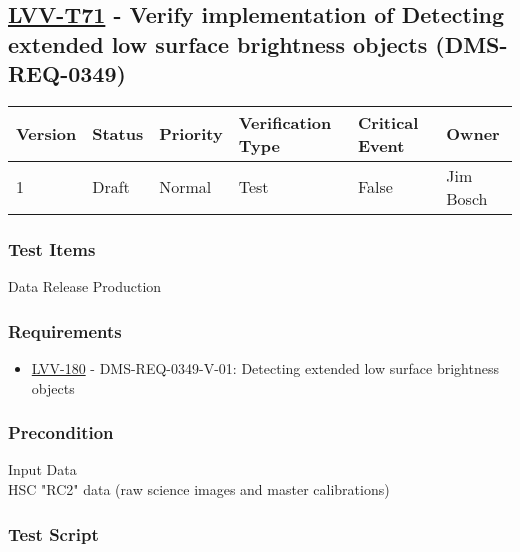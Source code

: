 \hypertarget{lvv-t71---verify-implementation-of-detecting-extended-low-surface-brightness-objects-dms-req-0349}{%
\subsection{\texorpdfstring{\href{https://jira.lsstcorp.org/secure/Tests.jspa\#/testCase/LVV-T71}{LVV-T71}
- Verify implementation of Detecting extended low surface brightness
objects
(DMS-REQ-0349)}{LVV-T71 - Verify implementation of Detecting extended low surface brightness objects (DMS-REQ-0349)}}\label{lvv-t71---verify-implementation-of-detecting-extended-low-surface-brightness-objects-dms-req-0349}}

\begin{longtable}[]{@{}llllll@{}}
\toprule
Version & Status & Priority & Verification Type & Critical Event &
Owner\tabularnewline
\midrule
\endhead
1 & Draft & Normal & Test & False & Jim Bosch\tabularnewline
\bottomrule
\end{longtable}

\hypertarget{test-items-47}{%
\subsubsection{Test Items}\label{test-items-47}}

Data Release Production

\hypertarget{requirements-48}{%
\subsubsection{Requirements}\label{requirements-48}}

\begin{itemize}
\tightlist
\item
  \href{https://jira.lsstcorp.org/browse/LVV-180}{LVV-180} -
  DMS-REQ-0349-V-01: Detecting extended low surface brightness objects
\end{itemize}

\hypertarget{precondition-6}{%
\subsubsection{Precondition}\label{precondition-6}}

Input Data\\
HSC "RC2" data (raw science images and master calibrations)

\hypertarget{test-script-48}{%
\subsubsection{Test Script}\label{test-script-48}}

